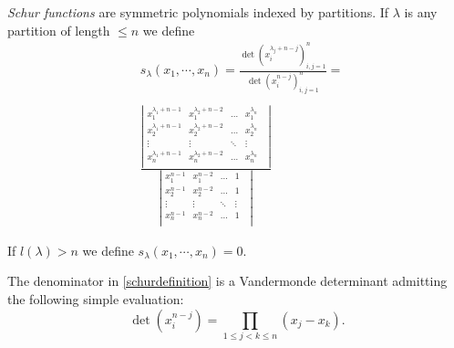 \documentclass[11pt]{amsart}
\newcommand{\tmem}[1]{{\em #1\/}}
\begin{document}
{\tmem{Schur functions}} are symmetric polynomials indexed by
partitions. If $\lambda$ is any partition of length $\leqslant n$
we define
\begin{equation}
\label{schurdefinition}
\begin{aligned}
& s_{\lambda} ( x_1, \cdots, x_n ) =
\frac{\det\left(x_i^{\lambda_{j}+n-j}\right)_{i, j=1}^{n}}
{\det\left(x_i^{n-j}\right)_{i, j=1}^{n}}=\\
&\\ & \frac{\left|
  \begin{array}{ccccc}
  x_1^{\lambda_1+n-1} &   x_1^{\lambda_2+n-2}&
\dots &  x_1^{\lambda_n}& \\
x_2^{\lambda_1+n-1} &   x_2^{\lambda_2+n-2}&
\dots &  x_2^{\lambda_n}& \\
    \vdots & \vdots &\ddots & \vdots & \\
x_n^{\lambda_1+n-1} &   x_n^{\lambda_2+n-2}&
\dots &  x_n^{\lambda_n}& \\
\end{array} \right|}{\left|
  \begin{array}{ccccc}
  x_1^{n-1} &   x_1^{n-2}&
\dots &  1 & \\
x_2^{n-1} &   x_2^{n-2}&
\dots &  1 & \\
    \vdots & \vdots &\ddots & \vdots & \\
x_n^{n-1} &   x_n^{n-2}&
\dots & 1 & \\
\end{array} \right|}
\end{aligned}
\end{equation}

If $l ( \lambda ) > n$ we define $s_{\lambda}(x_1,\cdots,x_n) =
0$.

The denominator in \eqref{schurdefinition} is a Vandermonde
determinant admitting the following simple evaluation:
\begin{equation} \label{vander} \det(x_{i}^{n-j}) = \prod_{1\leqslant j<k \leqslant n}(x_j-x_k).
\end{equation}
\end{document}
